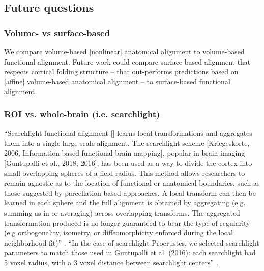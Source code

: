 \subsection{Future questions}



\subsubsection{Volume- vs surface-based}



We compare volume-based [nonlinear] anatomical alignment to volume-based
functional alignment.
%
Future work could compare surface-based alignment that respects cortical folding
structure -- that out-performs predictions based on [affine] volume-based
anatomical alignment \citep{weiner2018defining} -- to surface-based functional
alignment.


\subsubsection{ROI vs. whole-brain (i.e. searchlight)}



``Searchlight functional alignment [\citep{zhang2016searchlight,
guntupalli2016model}] learns local transformations and aggregates them into a
single large-scale alignment.
%
The searchlight scheme [Kriegeskorte, 2006, Information-based functional brain
mapping], popular in brain imaging [Guntupalli et al., 2018; 2016], has been
used as a way to divide the cortex into small overlapping spheres of a field
radius.
%
This method allows researchers to remain agnostic as to the location of
functional or anatomical boundaries, such as those suggested by
parcellation-based approaches.
%
A local transform can then be learned in each sphere and the full alignment is
obtained by aggregating (e.g. summing as in \citep{guntupalli2016model} or
averaging) across overlapping transforms.
%
The aggregated transformation produced is no longer guaranteed to bear the type
of regularity (e.g orthogonality, isometry, or diffeomorphicity enforced during
the local neighborhood fit)'' \citep{bazeille2021empirical}.
%
``In the case of searchlight Procrustes, we selected searchlight parameters to
match those used in Guntupalli et al. (2016):
%
each searchlight had 5 voxel radius, with a 3 voxel distance between searchlight
centers'' \citep{bazeille2021empirical}.


